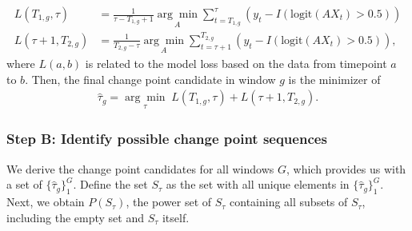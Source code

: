 \begin{align}
	L(T_{1,g},\tau) &= \frac{1}{\tau-T_{1,g} + 1}\underset{A}{\arg \min} \sum_{t = T_{1,g}}^{\tau}  (y_t - I(\text{logit}(AX_t)>0.5)) \\
	L(\tau+1,  T_{2,g}) &= \frac{1}{T_{2,g} - \tau}\underset{A}{\arg \min} \sum_{t = \tau+1}^{T_{2,g}}  (y_t - I(\text{logit}(AX_t)>0.5)),	
\end{align}
where $L(a,b)$ is related to the model loss based on the data from timepoint $a$ to $b$. 
Then, the final change point candidate in window $g$ is the minimizer of
\begin{align*}
	\hat{\tau}_g = \underset{\tau}{\arg \min } \; L(T_{1,g},\tau) + L(\tau+1,  T_{2,g}).
\end{align*}

\subsubsection*{Step B: Identify possible change point sequences} 
We derive the change point candidates for all windows $G$, which provides us with a set of $\{\hat{\tau}_g\}_1^{G}$. Define the set $S_{\tau}$ as the set with all unique elements in $\{\hat{\tau}_g\}_1^{G}$. Next, we obtain $P(S_{\tau})$, the power set of $S_{\tau}$ containing all subsets of $S_{\tau}$, including the empty set and $S_{\tau}$ itself.%

